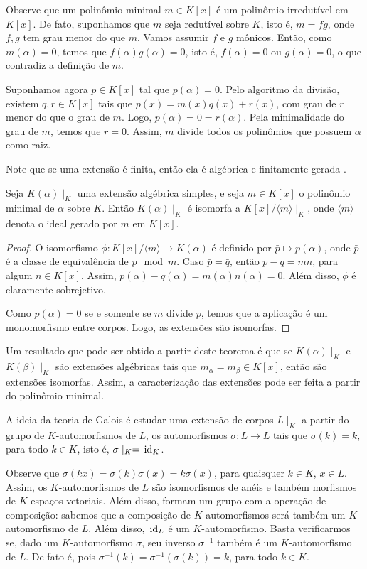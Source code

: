 Observe que um polinômio minimal $m \in K[x]$ é um polinômio irredutível em $K[x]$. De fato, suponhamos que $m$ seja redutível sobre $K$, isto é, $m = fg$, onde $f, g$ tem grau menor do que $m$. Vamos assumir $f$ e $g$ mônicos. Então, como $m(\alpha) =0$, temos que $f(\alpha)g(\alpha) = 0$, isto é, $f(\alpha) =0$ ou $g(\alpha) =0$, o que contradiz a definição de $m$. \par Suponhamos agora $p \in K[x]$ tal que $p(\alpha) =0$. Pelo algoritmo da divisão, existem $q, r \in K[x]$ tais que $p(x) = m(x) q(x) + r(x)$, com grau de $r$ menor do que o grau de $m$. Logo, $p(\alpha) = 0 = r(\alpha)$. Pela minimalidade do grau de $m$, temos que $r=0$. Assim, $m$ divide todos os polinômios que possuem $\alpha$ como raiz. \par
Note que se uma extensão é finita, então ela é algébrica e finitamente gerada \cite[Lemma 6.11.]{stewart}.
\begin{teo} \label{teo:isomorf}
Seja $K(\alpha)\mid_K$ uma extensão algébrica simples, e seja $m \in K[x]$ o polinômio minimal de $\alpha$ sobre $K$. Então $K(\alpha)\mid_K$ é isomorfa a $K[x]/\langle m \rangle \mid_K$, onde $\langle m \rangle$ denota o ideal gerado por $m$ em $K[x]$.
\begin{proof}
O isomorfismo $\phi: K[x]/ \langle m \rangle \rightarrow K(\alpha) $ é definido por $\bar{p}\mapsto p(\alpha)$, onde $\bar{p}$ é a classe de equivalência de $p \mod m$. Caso $\bar{p}=\bar{q}$, então $p-q = mn$, para algum $n \in K[x]$. Assim, $p(\alpha)-q(\alpha) = m(\alpha) n(\alpha) =0$. Além disso, $\phi$ é claramente sobrejetivo. \par 
Como $p(\alpha)=0$ se e somente se $m$ divide $p$, temos que a aplicação é um monomorfismo entre corpos. Logo, as extensões são isomorfas.
\end{proof}
\end{teo}
Um resultado que pode ser obtido a partir deste teorema é que se $K(\alpha)\mid_K$ e $K(\beta)\mid_K$ são extensões algébricas tais que $m_\alpha = m_\beta \in K[x]$, então são extensões isomorfas. Assim, a caracterização das extensões pode ser feita a partir do polinômio minimal.

A ideia da teoria de Galois é estudar uma extensão de corpos $L\mid_K$ a partir do grupo de $K$-automorfismos de $L$, os automorfismos $\sigma: L \rightarrow L$ tais que $\sigma(k)=k$, para todo $k \in K$, isto é, $\sigma\mid_K=\, \textrm{id}_{K}$. \par Observe que $\sigma(kx)=\sigma(k)\sigma(x) = k\sigma(x)$, para quaisquer $k \in K$, $x \in L$. Assim, os $K$-automorfismos de $L$ são isomorfismos de anéis e também morfismos de $K$-espaços vetoriais. Além disso, formam um grupo com a operação de composição: sabemos que a composição de $K$-automorfismos será também um $K$-automorfismo de $L$. Além disso, $\, \textrm{id}_{L}$ é um $K$-automorfismo. Basta verificarmos se, dado um $K$-automorfismo $\sigma$, seu inverso $\sigma^{-1}$ também é um $K$-automorfismo de $L$. De fato é, pois $\sigma^{-1}(k)=\sigma^{-1}(\sigma(k))=k$, para todo $k \in K$.

